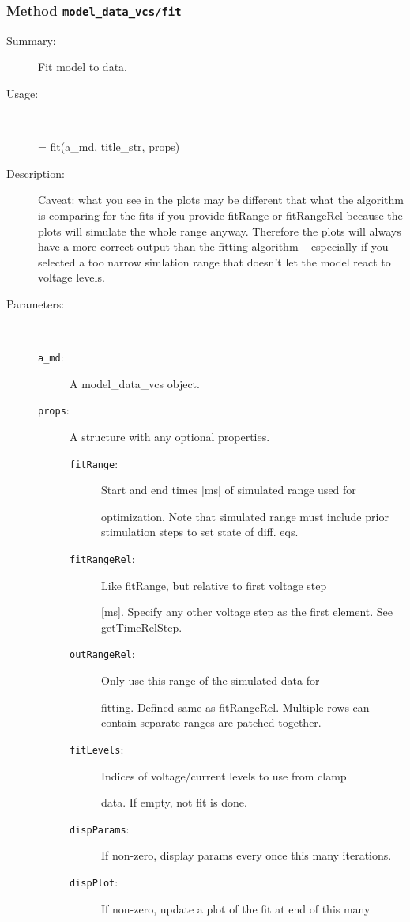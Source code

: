 \subsubsection[Method \texttt{fit}]{Method \texttt{model\_data\_vcs/fit}}%
%
\label{ref_model_data_vcs__fit}%
\hypertarget{ref_model_data_vcs__fit}{}%
\begin{description}
\item[Summary:]Fit model to data.
%
\item[Usage:]~%
\begin{lyxcode}%
[a\_md a\_doc] = fit(a\_md, title\_str, props)
%
\end{lyxcode}%
%
\item[Description:]%
Caveat: what you see in the plots may be different that what the
 algorithm is comparing for the fits if you provide fitRange or
 fitRangeRel because the plots will simulate the whole range
 anyway. Therefore the plots will always have a more correct output than
 the fitting algorithm -- especially if you selected a too narrow
 simlation range that doesn't let the model react to voltage levels.
\item[Parameters:]~
\begin{description}%
\item[\texttt{a\_md}:]
 A model\_data\_vcs object.
\item[\texttt{props}:]
 A structure with any optional properties.
\begin{description}%
\item[\texttt{fitRange}:]
 Start and end times [ms] of simulated range used for

optimization. Note that simulated range must include prior
stimulation steps to set state of diff. eqs.
\item[\texttt{fitRangeRel}:]
 Like fitRange, but relative to first voltage step

[ms]. Specify any other voltage step as the first
element. See getTimeRelStep.
\item[\texttt{outRangeRel}:]
 Only use this range of the simulated data for

fitting. Defined same as fitRangeRel. Multiple rows can contain
separate ranges are patched together.
\item[\texttt{fitLevels}:]
 Indices of voltage/current levels to use from clamp

data. If empty, not fit is done.
\item[\texttt{dispParams}:]
 If non-zero, display params every once this many iterations.
\item[\texttt{dispPlot}:]
 If non-zero, update a plot of the fit at end of this many


\end{description}
\end{description}
\end{description}

